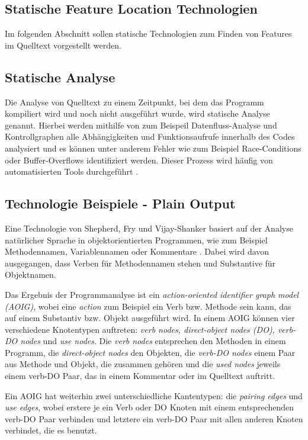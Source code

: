 \documentclass[runningheads,a4paper]{llncs}
\begin{document}
\subsection{Statische Feature Location Technologien}\label{static}

Im folgenden Abschnitt sollen statische Technologien zum Finden von Features im Quelltext vorgestellt werden.

\subsection*{Statische Analyse}

Die Analyse von Quelltext zu einem Zeitpunkt, bei dem das Programm kompiliert wird und noch nicht ausgeführt wurde, wird statische Analyse genannt. Hierbei werden mithilfe von zum Beispeil Datenfluss-Analyse und Kontrollgraphen alle Abhängigkeiten und Funktionsaufrufe innerhalb des Codes analysiert und es können unter anderem Fehler wie zum Beispiel Race-Conditions oder Buffer-Overflows identifiziert werden. Dieser Prozess wird häufig von automatisierten Tools durchgeführt \cite{static}.

\subsection*{Technologie Beispiele - Plain Output}

Eine Technologie von Shepherd, Fry und Vijay-Shanker basiert auf der Analyse natürlicher Sprache in objektorientierten Programmen, wie zum Beispiel Methodennamen, Variablennamen oder Kommentare \cite{shepherd}. Dabei wird davon ausgegangen, dass Verben für Methodennamen stehen und Substantive für Objektnamen.

Das Ergebnis der Programmanalyse ist ein \textit{action-oriented identifier graph model (AOIG)}, wobei eine \textit{action} zum Beispiel ein Verb bzw. Methode sein kann, das auf einem Substantiv bzw. Objekt ausgeführt wird. In einem AOIG können vier verschiedene Knotentypen auftreten: \textit{verb nodes, direct-object nodes (DO), verb-DO nodes} und \textit{use nodes}. Die \textit{verb nodes} entsprechen den Methoden in einem Programm, die \textit{direct-object nodes} den Objekten, die \textit{verb-DO nodes} einem Paar aus Methode und Objekt, die zusammen gehören und die \textit{used nodes} jeweils einem verb-DO Paar, das in einem Kommentar oder im Quelltext auftritt.

Ein AOIG hat weiterhin zwei unterschiedliche Kantentypen: die \textit{pairing edges} und \textit{use edges}, wobei erstere je ein Verb oder DO Knoten mit einem entsprechenden verb-DO Paar verbinden und letztere ein verb-DO Paar mit allen anderen Knoten verbindet, die es benutzt.
\end{document}
